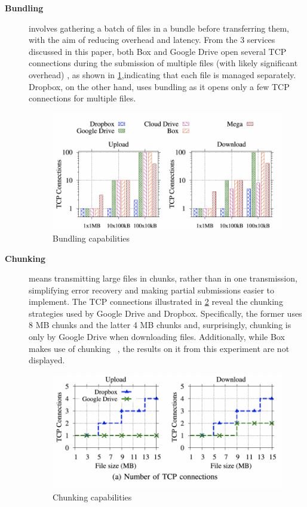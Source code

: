 \begin{description}
	\item[\textbf{Bundling}] involves gathering a batch of files in a bundle before transferring them, with the aim of reducing overhead and latency. From the 3 services discussed in this paper, both Box and Google Drive open several TCP connections during the submission of multiple files (with likely significant overhead) , as shown in  \ref{fig:bundling},indicating that each file is managed separately. Dropbox, on the other hand, uses bundling as it opens only a few TCP connections for multiple files.
	
	\begin{figure} [h]
		\centering
		\includegraphics[scale=0.7]{images/bundling}
		\caption{\label{fig:bundling}Bundling capabilities}
	\end{figure}
	
	\item[\textbf{Chunking}] means transmitting large files in chunks, rather than in one transmission, simplifying error recovery and making partial submissions easier to implement. The TCP connections illustrated in \ref{fig:chunking} reveal the chunking strategies used by Google Drive and Dropbox. Specifically, the former uses 8 MB chunks and the latter 4 MB chunks and, surprisingly, chunking is only by Google Drive when  downloading files. Additionally, while Box makes use of chunking ~\cite{box_chunked}, the results on it from this experiment are not displayed.
	
	\begin{figure} [h]
		\centering
		\includegraphics[scale=0.7]{images/chunking}
		\caption{\label{fig:chunking}Chunking capabilities}
	\end{figure}
	

\end{description}
